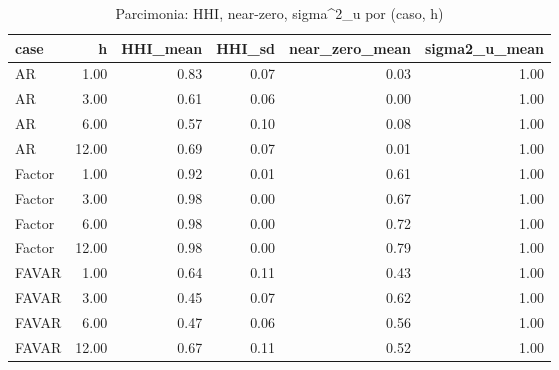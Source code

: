 \begin{table}[ht]
\centering
\begin{tabular}{lrrrrr}
  \hline
case & h & HHI\_mean & HHI\_sd & near\_zero\_mean & sigma2\_u\_mean \\ 
  \hline
AR & 1.00 & 0.83 & 0.07 & 0.03 & 1.00 \\ 
  AR & 3.00 & 0.61 & 0.06 & 0.00 & 1.00 \\ 
  AR & 6.00 & 0.57 & 0.10 & 0.08 & 1.00 \\ 
  AR & 12.00 & 0.69 & 0.07 & 0.01 & 1.00 \\ 
  Factor & 1.00 & 0.92 & 0.01 & 0.61 & 1.00 \\ 
  Factor & 3.00 & 0.98 & 0.00 & 0.67 & 1.00 \\ 
  Factor & 6.00 & 0.98 & 0.00 & 0.72 & 1.00 \\ 
  Factor & 12.00 & 0.98 & 0.00 & 0.79 & 1.00 \\ 
  FAVAR & 1.00 & 0.64 & 0.11 & 0.43 & 1.00 \\ 
  FAVAR & 3.00 & 0.45 & 0.07 & 0.62 & 1.00 \\ 
  FAVAR & 6.00 & 0.47 & 0.06 & 0.56 & 1.00 \\ 
  FAVAR & 12.00 & 0.67 & 0.11 & 0.52 & 1.00 \\ 
   \hline
\end{tabular}
\caption{Parcimonia: HHI, near-zero, sigma^2_u por (caso, h)} 
\label{tab:parcimonia}
\end{table}
